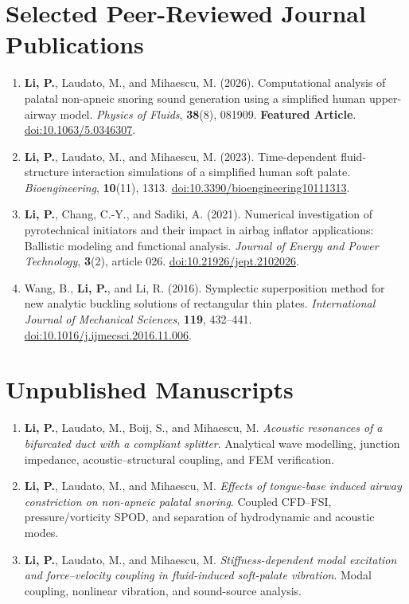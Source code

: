 \documentclass[a4paper,10pt]{article}
\begin{document}
\section{Selected Peer-Reviewed Journal Publications}
\begin{enumerate}
\item \textbf{Li, P.}, Laudato, M., and Mihaescu, M. (2026).
Computational analysis of palatal non-apneic snoring sound generation using a simplified
human upper-airway model. \textit{Physics of Fluids}, \textbf{38}(8), 081909.
\textbf{Featured Article}.
\href{https://doi.org/10.1063/5.0346307}{doi:10.1063/5.0346307}.
\item \textbf{Li, P.}, Laudato, M., and Mihaescu, M. (2023).
Time-dependent fluid-structure interaction simulations of a simplified human soft palate.
\textit{Bioengineering}, \textbf{10}(11), 1313.
\href{https://doi.org/10.3390/bioengineering10111313}{doi:10.3390/bioengineering10111313}.
\item \textbf{Li, P.}, Chang, C.-Y., and Sadiki, A. (2021).
Numerical investigation of pyrotechnical initiators and their impact in airbag inflator
applications: Ballistic modeling and functional analysis.
\textit{Journal of Energy and Power Technology}, \textbf{3}(2), article 026.
\href{https://doi.org/10.21926/jept.2102026}{doi:10.21926/jept.2102026}.
\item Wang, B., \textbf{Li, P.}, and Li, R. (2016).
Symplectic superposition method for new analytic buckling solutions of rectangular thin plates.
\textit{International Journal of Mechanical Sciences}, \textbf{119}, 432--441.
\href{https://doi.org/10.1016/j.ijmecsci.2016.11.006}{doi:10.1016/j.ijmecsci.2016.11.006}.
\end{enumerate}

\section{Unpublished Manuscripts}
\begin{enumerate}
\item \textbf{Li, P.}, Laudato, M., Boij, S., and Mihaescu, M.
\textit{Acoustic resonances of a bifurcated duct with a compliant splitter}.
Analytical wave modelling, junction impedance, acoustic--structural coupling, and FEM verification.
\item \textbf{Li, P.}, Laudato, M., and Mihaescu, M.
\textit{Effects of tongue-base induced airway constriction on non-apneic palatal snoring}.
Coupled CFD--FSI, pressure/vorticity SPOD, and separation of hydrodynamic and acoustic modes.
\item \textbf{Li, P.}, Laudato, M., and Mihaescu, M.
\textit{Stiffness-dependent modal excitation and force--velocity coupling in fluid-induced soft-palate vibration}.
Modal coupling, nonlinear vibration, and sound-source analysis.
\end{enumerate}
\end{document}
